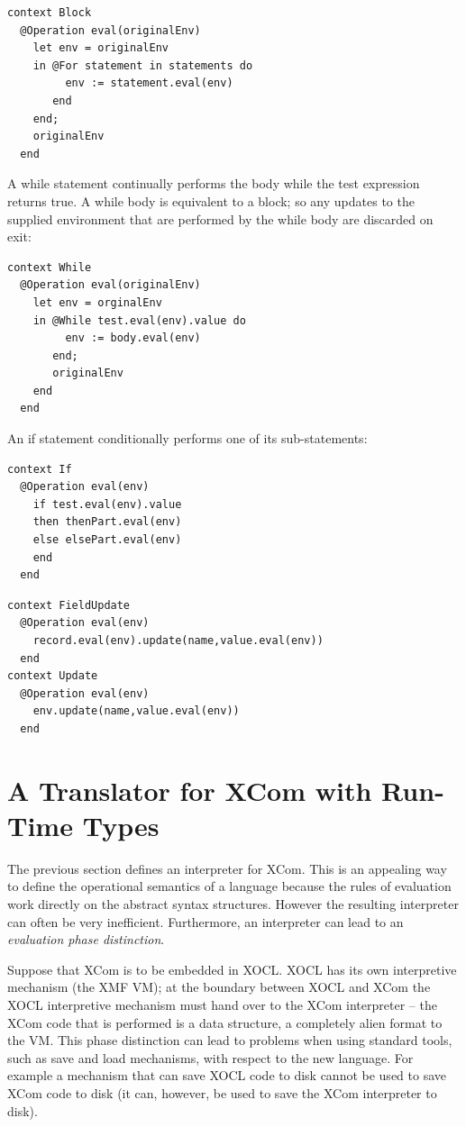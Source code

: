 \begin{lstlisting}
context Block
  @Operation eval(originalEnv)
    let env = originalEnv
    in @For statement in statements do
         env := statement.eval(env)
       end
    end;
    originalEnv
  end
\end{lstlisting}A while statement continually performs the body while the test expression
returns true. A while body is equivalent to a block; so any updates
to the supplied environment that are performed by the while body are
discarded on exit:

\begin{lstlisting}
context While
  @Operation eval(originalEnv)
    let env = orginalEnv
    in @While test.eval(env).value do
         env := body.eval(env)
       end;
       originalEnv
    end
  end
\end{lstlisting}An if statement conditionally performs one of its sub-statements:

\begin{lstlisting}
context If
  @Operation eval(env)
    if test.eval(env).value
    then thenPart.eval(env)
    else elsePart.eval(env)
    end
  end
\end{lstlisting}\begin{lstlisting}
context FieldUpdate
  @Operation eval(env)
    record.eval(env).update(name,value.eval(env))
  end
context Update
  @Operation eval(env)
    env.update(name,value.eval(env))
  end
\end{lstlisting}
\section{A Translator for XCom with Run-Time Types}

The previous section defines an interpreter for XCom. This is an appealing
way to define the operational semantics of a language because the
rules of evaluation work directly on the abstract syntax structures.
However the resulting interpreter can often be very inefficient. Furthermore,
an interpreter can lead to an \emph{evaluation phase distinction}.

Suppose that XCom is to be embedded in XOCL. XOCL has its own interpretive
mechanism (the XMF VM); at the boundary between XOCL and XCom the
XOCL interpretive mechanism must hand over to the XCom interpreter
-- the XCom code that is performed is a data structure, a completely
alien format to the VM. This phase distinction can lead to problems
when using standard tools, such as save and load mechanisms, with
respect to the new language. For example a mechanism that can save
XOCL code to disk cannot be used to save XCom code to disk (it can,
however, be used to save the XCom interpreter to disk).

